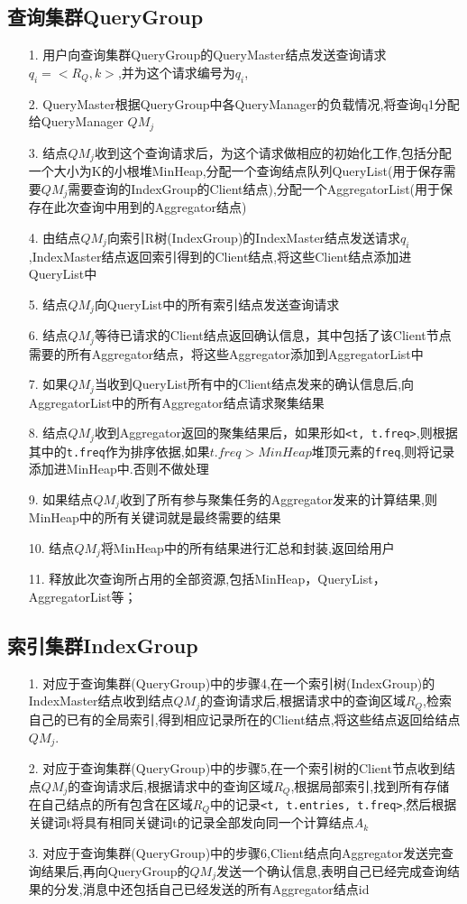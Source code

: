 \documentclass{elegantpaper}
\begin{document}
\subsection{查询集群QueryGroup}
\begin{itemize}
    \item[1.] 用户向查询集群QueryGroup的QueryMaster结点发送查询请求$q_i=<R_Q,k>$,并为这个请求编号为$q_i$,
    \item[2.] QueryMaster根据QueryGroup中各QueryManager的负载情况,将查询q1分配给QueryManager $QM_j$
    \item[3.] 结点$QM_j$收到这个查询请求后，为这个请求做相应的初始化工作,包括分配一个大小为K的小根堆MinHeap,分配一个查询结点队列QueryList(用于保存需要$QM_j$需要查询的IndexGroup的Client结点),分配一个AggregatorList(用于保存在此次查询中用到的Aggregator结点)
    \item[4.] 由结点$QM_j$向索引R树(IndexGroup)的IndexMaster结点发送请求$q_i$,IndexMaster结点返回索引得到的Client结点,将这些Client结点添加进QueryList中
    \item[5.] 结点$QM_j$向QueryList中的所有索引结点发送查询请求
    \item[6.] 结点$QM_j$等待已请求的Client结点返回确认信息，其中包括了该Client节点需要的所有Aggregator结点，将这些Aggregator添加到AggregatorList中
    \item[7.] 如果$QM_j$当收到QueryList所有中的Client结点发来的确认信息后,向AggregatorList中的所有Aggregator结点请求聚集结果
    \item[8.] 结点$QM_j$收到Aggregator返回的聚集结果后，如果形如\verb|<t, t.freq>|,则根据其中的\verb|t.freq|作为排序依据,如果$t.freq > MinHeap$堆顶元素的\verb|freq|,则将记录添加进MinHeap中.否则不做处理
    \item[9.] 如果结点$QM_j$收到了所有参与聚集任务的Aggregator发来的计算结果,则MinHeap中的所有关键词就是最终需要的结果
    \item[10.] 结点$QM_j$将MinHeap中的所有结果进行汇总和封装,返回给用户
    \item[11.] 释放此次查询所占用的全部资源,包括MinHeap，QueryList，AggregatorList等；
\end{itemize}
\subsection{索引集群IndexGroup}
\begin{itemize}
    \item[1.] 对应于查询集群(QueryGroup)中的步骤4,在一个索引树(IndexGroup)的IndexMaster结点收到结点$QM_j$的查询请求后,根据请求中的查询区域$R_Q$,检索自己的已有的全局索引,得到相应记录所在的Client结点,将这些结点返回给结点$QM_j$.
    \item[2.] 对应于查询集群(QueryGroup)中的步骤5,在一个索引树的Client节点收到结点$QM_j$的查询请求后,根据请求中的查询区域$R_Q$,根据局部索引,找到所有存储在自己结点的所有包含在区域$R_Q$中的记录\verb|<t, t.entries, t.freq>|,然后根据关键词t将具有相同关键词t的记录全部发向同一个计算结点$A_k$
    \item[3.] 对应于查询集群(QueryGroup)中的步骤6,Client结点向Aggregator发送完查询结果后,再向QueryGroup的$QM_j$发送一个确认信息,表明自己已经完成查询结果的分发,消息中还包括自己已经发送的所有Aggregator结点id
\end{itemize}
\end{document}
